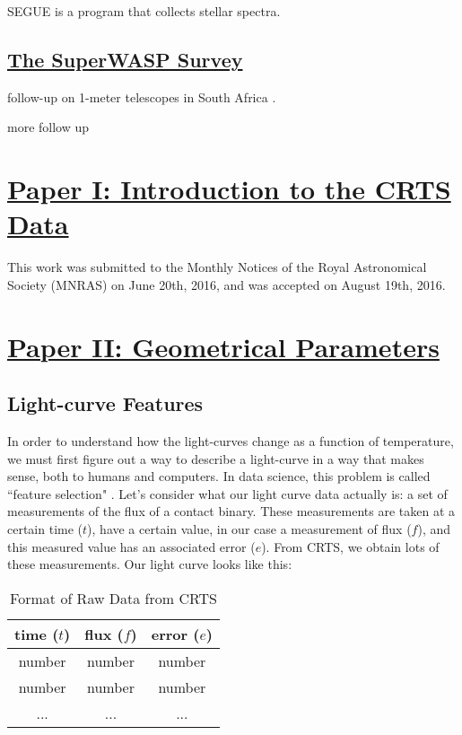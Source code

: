 \documentclass[12pt]{article} %
\numberwithin{equation}{section} %
\begin{document}
SEGUE is a program that collects stellar spectra.

\subsection[The SuperWASP Survey]{\hyperlink{toc}{The SuperWASP Survey}}

follow-up on 1-meter telescopes in South Africa \citep{koen2016multi}.

more follow up \citep{darwish2016orbital}

\section[Paper I: Introduction to the CRTS Data]{\hyperlink{toc}{Paper I: Introduction to the CRTS Data}} \label{sec: Paper I: Introduction to the CRTS Data}

This work was submitted to the Monthly Notices of the Royal Astronomical Society (MNRAS) on June 20th, 2016, and was accepted on August 19th, 2016.



\section[Paper II: Geometrical Parameters]{\hyperlink{toc}{Paper II: Geometrical Parameters}} \label{sec: Paper II: Geometrical Parameters}

\subsection[Light-curve Features]{Light-curve Features} \label{sec: Light-curve Features}

In order to understand how the light-curves change as a function of temperature, we must first figure out a way to describe a light-curve in a way that makes sense, both to humans and computers. In data science, this problem is called ``feature selection" . Let's consider what our light curve data actually is: a set of measurements of the flux of a contact binary. These measurements are taken at a certain time ($t$), have a certain value, in our case a measurement of flux ($f$), and this measured value has an associated error ($e$). From CRTS, we obtain lots of these measurements. Our light curve looks like this:

\begin{table}[htdp]
\caption{Format of Raw Data from CRTS}
\begin{center}
\begin{tabular}{|c|c|c|} \hline
\textbf{time} ($t$) & \textbf{flux} ($f$) & \textbf{error} ($e$) \\ \hline
number & number & number \\ \hline
number & number & number \\ \hline
... & ... & ... \\
\end{tabular}
\end{center}
\label{default}
\end{table}%
\end{document}
